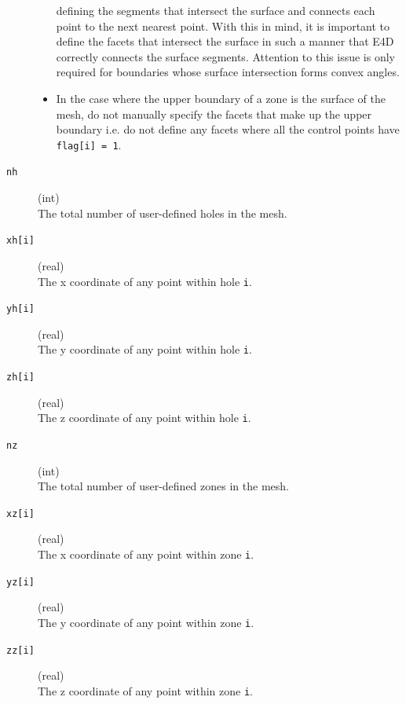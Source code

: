 \documentclass[a4paper,12pt]{article}
\begin{document}
\begin{description}
\begin{itemize}
                    defining the segments that intersect the surface and connects each point to the
                    next nearest point. With this in mind, it is important to define the facets
                    that intersect the surface in such a manner that E4D correctly connects the
                    surface segments. Attention to this issue is only required for boundaries whose
                    surface intersection forms convex angles.
              \item In the case where the upper boundary of a zone is the surface of the mesh, do
                    not manually specify the facets that make up the upper boundary i.e. do not
                    define any facets where all the control points have \texttt{flag[i] = 1}.
          \end{itemize}

    \item[\texttt{nh}] (int)\hfill \\
          The total number of user-defined holes in the mesh.

    \item[\texttt{xh[i]}] (real)\hfill \\
          The x coordinate of any point within hole \texttt{i}.

    \item[\texttt{yh[i]}] (real)\hfill \\
          The y coordinate of any point within hole \texttt{i}.

    \item[\texttt{zh[i]}] (real)\hfill \\
          The z coordinate of any point within hole \texttt{i}.

    \item[\texttt{nz}] (int)\hfill \\
          The total number of user-defined zones in the mesh.

    \item[\texttt{xz[i]}] (real)\hfill \\
          The x coordinate of any point within zone \texttt{i}.

    \item[\texttt{yz[i]}] (real)\hfill \\
          The y coordinate of any point within zone \texttt{i}.

    \item[\texttt{zz[i]}] (real)\hfill \\
          The z coordinate of any point within zone \texttt{i}.


\end{description}
\end{document}
